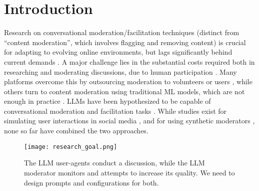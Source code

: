 %
\section{Introduction}
\label{sec:introduction}

Research on conversational moderation/facilitation techniques (distinct from “content moderation”, which involves flagging and removing content) is crucial for adapting to evolving online environments, but lags significantly behind current demands \cite{seering_self_moderation, make_reddit_great}. A major challenge lies in the substantial costs required both in researching and moderating discussions, due to human participation \cite{rossi_2024}. Many platforms overcome this by outsourcing moderation to volunteers or users \cite{Matias2019TheCL, schaffner_community_guidelines}, while others turn to content moderation using traditional \ac{ML} models, which are not enough in practice \cite{horta_automated_moderation, schaffner_community_guidelines}. \acfp{LLM} have been hypothesized to be capable of conversational moderation and facilitation tasks \cite{small-polis-llm, korre2025evaluation}. While studies exist for simulating user interactions in social media \cite{park_simulacra, mou_2024, tornberg_2023, y_social, balog_2024}, and for using synthetic moderators \cite{kim_et_al_chatbot, cho-etal-2024-language}, none so far have combined the two approaches. 

\begin{figure}[hbt!]
	\centering
	\texttt{[image: research\_goal.png]}
	\caption{The \ac{LLM} user-agents conduct a discussion, while the \ac{LLM} moderator monitors and attempts to increase its quality. We need to design prompts and configurations for both.}
	\label{fig::goals}
\end{figure}


